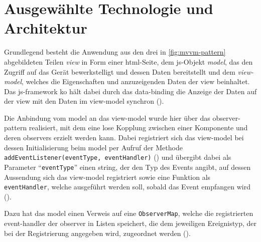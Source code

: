 
\section{Ausgewählte Technologie und Architektur}	%


	
Grundlegend besteht die Anwendung aus den drei in \autoref{fig:mvvm-pattern} abgebildeten Teilen \emph{\gls{view}} in Form einer \gls{html}-Seite, dem \gls{js}-Objekt \emph{\gls{model}}, das den Zugriff auf das Gerät bewerkstelligt und dessen Daten bereitstellt und dem \emph{\gls{view-model}}, welches die Eigenschaften und anzuzeigenden Daten der \gls{view} beinhaltet.
Das \gls{js}-\gls{framework} \gls{ko} hält dabei durch das \gls{data-binding} die Anzeige der Daten auf der \gls{view} mit den Daten im \gls{view-model} synchron ().

Die Anbindung vom \gls{model} an das \gls{view-model} wurde hier über das \gls{observer-pattern} realisiert, mit dem eine lose Kopplung zwischen einer Komponente und deren \glspl{observer} erzielt werden kann.
Dabei registriert sich das \gls{view-model} bei dessen Initialisierung beim \gls{model} per Aufruf der Methode \lstinline|addEventListener(eventType, eventHandler)| () und übergibt dabei als Parameter \enquote{\lstinline|eventType|} einen \gls{string}, der den Typ des Events angibt, auf dessen Aussendung sich das \gls{view-model} registriert sowie eine Funktion als \lstinline|eventHandler|, welche ausgeführt werden soll, sobald das Event empfangen wird ().

Dazu hat das \gls{model} einen Verweis auf eine \lstinline|ObserverMap|, welche die registrierten \gls{event-handler} der \gls{observer} in Listen speichert, die dem jeweiligen Ereignistyp, der bei der Registrierung angegeben wird, zugeordnet werden ().

